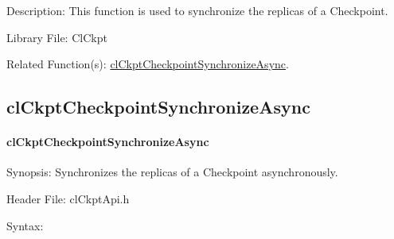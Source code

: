 \begin{flushleft}
\begin{Desc}
\begin{description}
\end{description}
\end{Desc}
\begin{Desc}
\item[Description:]This function is used to synchronize the replicas of a Checkpoint.\end{Desc}
\begin{Desc}
\item[Library File:]Cl\-Ckpt\end{Desc}
\begin{Desc}
\item[Related Function(s):]\hyperlink{pageckpt120}{cl\-Ckpt\-Checkpoint\-Synchronize\-Async}. \end{Desc}
\newpage


\subsection{clCkptCheckpointSynchronizeAsync}
\hypertarget{pageckpt120}{}\paragraph{cl\-Ckpt\-Checkpoint\-Synchronize\-Async}\label{pageckpt120}
\begin{Desc}
\item[Synopsis:]Synchronizes the replicas of a Checkpoint asynchronously.\end{Desc}
\begin{Desc}
\item[Header File:]clCkptApi.h\end{Desc}
\begin{Desc}
\item[Syntax:]


\end{Desc}
\end{flushleft}
